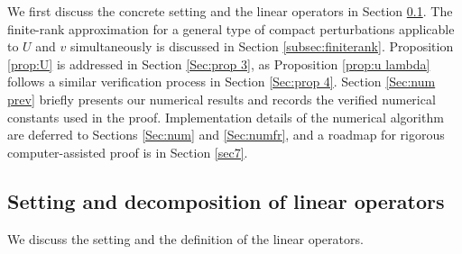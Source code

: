 \documentclass[11pt,a4paper]{article}
\numberwithin{equation}{section}
\begin{document}
We first discuss the concrete setting and the linear operators in Section \ref{Sec:summary}. The finite-rank approximation for a general type of compact perturbations applicable to $U$ and $v$ simultaneously is discussed in Section \ref{subsec:finiterank}. %
Proposition \ref{prop:U} is addressed in Section \ref{Sec:prop 3}, as
Proposition \ref{prop:u lambda} follows a similar verification process in
Section \ref{Sec:prop 4}.  Section
\ref{Sec:num prev} briefly presents our numerical results and records the verified numerical constants used in the proof. Implementation details of the numerical
algorithm are deferred to Sections \ref{Sec:num} and \ref{Sec:numfr}, and a roadmap for rigorous computer-assisted proof is in Section \ref{sec7}.

\subsection{Setting and decomposition of linear operators}\label{Sec:summary}
We discuss the setting and the definition of the linear operators.
\end{document}
